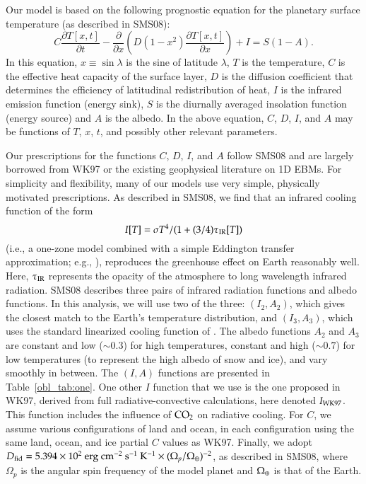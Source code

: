 Our model is based on the following prognostic equation for the
planetary surface temperature (as described in SMS08):
\begin{equation}
\label{obl_eq:diffu eq1}
C \frac{\partial T[x,t]}{\partial t} - \frac{\partial}{\partial x}
\left( D(1 - x^2) \frac{\partial T[x,t]}{\partial x} \right) + I = S
(1 - A).
\end{equation}
In this equation, $x \equiv \sin \lambda$ is the sine of latitude
$\lambda$, $T$ is the temperature, $C$ is the effective heat capacity
of the surface layer, $D$ is the diffusion coefficient that determines
the efficiency of latitudinal redistribution of heat, $I$ is the
infrared emission function (energy sink), $S$ is the diurnally
averaged insolation function (energy source) and $A$ is the albedo. In
the above equation, $C$, $D$, $I$, and $A$ may be functions of $T$,
$x$, $t$, and possibly other relevant parameters.

Our prescriptions for the functions $C$, $D$, $I$, and $A$ follow
SMS08 and are largely borrowed from WK97 or the existing geophysical
literature on 1D EBMs. For simplicity and flexibility, many of our
models use very simple, physically motivated prescriptions. As
described in SMS08, we find that an infrared cooling function of the
form
\begin{equation}
I[T] = \sigma T^4 / (1 + (3/4)\tau_{\rm IR}[T])
\label{obl_eq:I}
\end{equation}
(i.e., a one-zone model combined with a simple Eddington transfer
approximation; e.g., \citealt{shu1982}), reproduces the greenhouse
effect on Earth reasonably well.  Here, $\tau_{\rm IR}$ represents the
opacity of the atmosphere to long wavelength infrared radiation.
SMS08 describes three pairs of infrared radiation functions and albedo
functions.  In this analysis, we will use two of the three:
$(I_2,A_2)$, which gives the closest match to the Earth's temperature
distribution, and $(I_3,A_3)$, which uses the standard linearized
cooling function of \citet{north+coakley1979}.  The albedo functions
$A_2$ and $A_3$ are constant and low ($\sim 0.3$) for high
temperatures, constant and high ($\sim 0.7$) for low temperatures (to
represent the high albedo of snow and ice), and vary smoothly in
between.  The $(I,A)$ functions are presented in
Table~\ref{obl_tab:one}.  One other $I$ function that we use is the
one proposed in WK97, derived from full radiative-convective
calculations, here denoted $I_{\rm WK97}$.  This function includes the
influence of $\rm CO_2$ on radiative cooling.  For $C$, we assume
various configurations of land and ocean, in each configuration using
the same land, ocean, and ice partial $C$ values as WK97.  Finally, we
adopt $D_{\rm fid} = 5.394\times 10^2 {\rm
~erg~cm^{-2}~s^{-1}~K^{-1}}\times (\Omega_p/\Omega_\oplus)^{-2}$, as
described in SMS08, where $\Omega_p$ is the angular spin frequency of
the model planet and $\Omega_\oplus$ is that of the Earth.

